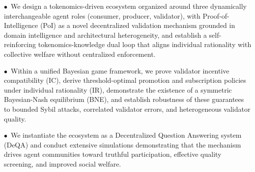 $\bullet$~We design a tokenomics-driven ecosystem organized around three dynamically interchangeable agent roles (consumer, producer, validator), with Proof-of-Intelligence (PoI) as a novel decentralized validation mechanism grounded in domain intelligence and architectural heterogeneity, and establish a self-reinforcing tokenomics-knowledge dual loop that aligns individual rationality with collective welfare without centralized enforcement.

$\bullet$~Within a unified Bayesian game framework, we prove validator incentive compatibility (IC), derive threshold-optimal promotion and subscription policies under individual rationality (IR), demonstrate the existence of a symmetric Bayesian-Nash equilibrium (BNE), and establish robustness of these guarantees to bounded Sybil attacks, correlated validator errors, and heterogeneous validator quality.

$\bullet$~We instantiate the ecosystem as a Decentralized Question Answering system (DeQA) and conduct extensive simulations demonstrating that the mechanism drives agent communities toward truthful participation, effective quality screening, and improved social welfare.

